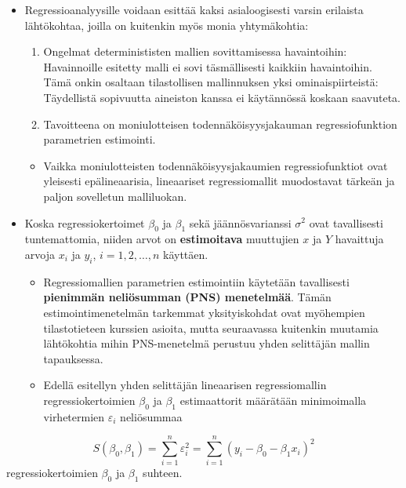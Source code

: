 \documentclass[
]{book}
\providecommand{\tightlist}{%
  \setlength{\itemsep}{0pt}\setlength{\parskip}{0pt}}
\begin{document}
\hfill\break

\begin{itemize}
\tightlist
\item
  Regressioanalyysille voidaan esittää kaksi asialoogisesti varsin erilaista lähtökohtaa, joilla on kuitenkin myös monia yhtymäkohtia:

  \begin{enumerate}
  \def\labelenumi{\roman{enumi})}
  \tightlist
  \item
    Ongelmat determinististen mallien sovittamisessa havaintoihin: Havainnoille esitetty malli ei sovi täsmällisesti kaikkiin havaintoihin. Tämä onkin osaltaan tilastollisen mallinnuksen yksi ominaispiirteistä: Täydellistä sopivuutta aineiston kanssa ei käytännössä koskaan saavuteta.
  \item
    Tavoitteena on moniulotteisen todennäköisyysjakauman regressiofunktion parametrien estimointi.
  \end{enumerate}

  \begin{itemize}
  \tightlist
  \item
    Vaikka moniulotteisten todennäköisyysjakaumien regressiofunktiot ovat yleisesti epälineaarisia, lineaariset regressiomallit muodostavat tärkeän ja paljon sovelletun malliluokan.
  \end{itemize}
\item
  Koska regressiokertoimet \(\beta_0\) ja \(\beta_1\) sekä jäännösvarianssi \(\sigma^2\) ovat tavallisesti tuntemattomia, niiden arvot on \textbf{estimoitava} muuttujien \(x\) ja \(Y\) havaittuja arvoja \(x_i\) ja \(y_i\), \(i=1,2, \ldots, n\) käyttäen.

  \begin{itemize}
  \tightlist
  \item
    Regressiomallien parametrien estimointiin käytetään tavallisesti \textbf{pienimmän neliösumman (PNS) menetelmää}. Tämän estimointimenetelmän tarkemmat yksityiskohdat ovat myöhempien tilastotieteen kurssien asioita, mutta seuraavassa kuitenkin muutamia lähtökohtia mihin PNS-menetelmä perustuu yhden selittäjän mallin tapauksessa.
  \item
    Edellä esitellyn yhden selittäjän lineaarisen regressiomallin regressiokertoimien \(\beta_0\) ja \(\beta_1\) estimaattorit määrätään minimoimalla virhetermien \(\varepsilon_i\) neliösummaa
  \end{itemize}
\end{itemize}

\[
S(\beta_0,\beta_1) = \sum_{i=1}^{n} \varepsilon^2_i = \sum_{i=1}^{n} (y_i - \beta_0 - \beta_1 x_i)^2 
\]
regressiokertoimien \(\beta_0\) ja \(\beta_1\) suhteen.
\end{document}
